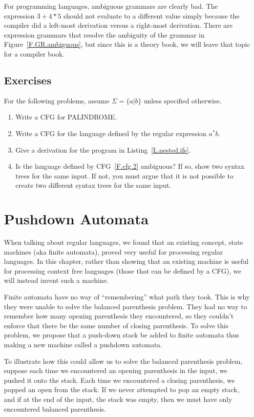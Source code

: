 \documentclass[letterpaper,12pt,openany,reqno]{book}%
\begin{document}
For programming languages, ambiguous grammars are clearly bad. The expression $3+4*5$ should not evaluate to a different value simply because the compiler did a left-most derivation versus a right-most derivation. There are expression grammars that resolve the ambiguity of the grammar in Figure~\ref{F.GR.ambiguous}, but since this is a theory book, we will leave that topic for a compiler book.

\section{Exercises}
For the following problems, assume $\Sigma = \{a|b\}$ unless specified otherwise.
\begin{enumerate}
\item Write a CFG for PALINDROME.
\item Write a CFG for the language defined by the regular expression $a^*b$.
\item Give a derivation for the program in Listing~\ref{L.nested.ifs}.
\item Is the language defined by CFG~\ref{F.cfg.2} ambiguous? If so, show two syntax trees for the same input. If not, you must argue that it is not possible to create two different syntax trees for the same input.
\end{enumerate}

\chapter{Pushdown Automata}
When talking about regular languages, we found that an existing concept, state machines (aka finite automata), proved very useful for processing regular languages. In this chapter, rather than showing that an existing machine is useful for processing context free languages (those that can be defined by a CFG), we will instead invent such a machine.

Finite automata have no way of ``remembering'' what path they took. This is why they were unable to solve the balanced parenthesis problem. They had no way to remember how many opening parenthesis they encountered, so they couldn't enforce that there be the same number of closing parenthesis. To solve this problem, we propose that a push-down stack be added to finite automata thus making a new machine called a pushdown automata.

To illustrate how this could allow us to solve the balanced parenthesis problem, suppose each time we encountered an opening parenthesis in the input, we pushed it onto the stack. Each time we encountered a closing parenthesis, we popped an open from the stack. If we never attempted to pop an empty stack, and if at the end of the input, the stack was empty, then we must have only encountered balanced parenthesis.
\end{document}
